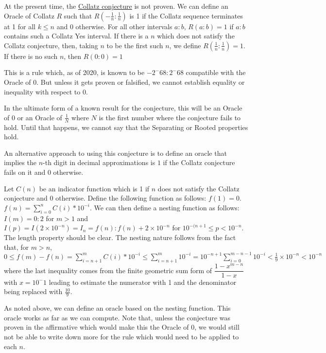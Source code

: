 \documentclass[12pt]{article}
\theoremstyle{remark}
\begin{document}
At the present time, the \href{https://en.wikipedia.org/wiki/Collatz_conjecture}{Collatz conjecture} is not proven. We can define an Oracle of Collatz $R$ such that $R(-\tfrac{1}{n}:\tfrac{1}{n})$ is 1 if the Collatz sequence terminates at 1 for all $k \leq n$ and 0 otherwise. For all other intervals $a:b$, $R(a:b) = 1$ if $a:b$ contains such a Collatz Yes interval. If there is a $n$ which does not satisfy the Collatz conjecture, then, taking $n$ to be the first such $n$, we define $R(\tfrac{1}{n}:\tfrac{1}{n}) = 1$. If there is no such $n$, then $R(0:0) = 1$

This is a rule which, as of 2020, is known to be $-2^-68:2^-68$ compatible with the Oracle of 0. But unless it gets proven or falsified, we cannot establish equality or inequality with respect to 0. 

In the ultimate form of a known result for the conjecture, this will be an Oracle of 0 or an Oracle of $\tfrac{1}{N}$ where $N$ is the first number where the conjecture fails to hold. Until that happens, we cannot say that the Separating or Rooted properties hold. 

An alternative approach to using this conjecture is to define an oracle that implies the $n$-th digit in decimal approximations is $1$ if the Collatz conjecture fails on it and $0$ otherwise.

Let $C(n)$ be an indicator function which is 1 if $n$ does not satisfy the Collatz conjecture and 0 otherwise. Define the following function as follows: $f(1) = 0$. $f(n) = \sum_{i=0}^n C(i)*10^{-i} $.  We can then define a nesting function as follows: $I(m)=0:2$ for $m > 1$ and $I(p) = I(2 \times 10^{-n}) = I_n = f(n): f(n)+2 \times 10^{-n}$ for $10^{-(n+1} \leq p < 10^{-n}$. The length property should be clear. The nesting nature follows from the fact that, for $m > n$,  $0 \leq  f(m)-f(n) = \sum_{i=n+1}^m C(i)*10^{-i} \leq \sum_{i=n+1}^m 10^{-i} = 10^{-n+1}\sum_{i=0}^{m-n-1} 10^{-i} < \tfrac{1}{9} \times 10^{-n} < 10^{-n} $ where the last inequality comes from the finite geometric sum form of $\dfrac{1-x^{m-n}}{1-x}$ with $x=10^-1$ leading to estimate the numerator with 1 and the denominator being replaced with $\tfrac{10}{9}$. 

As noted above, we can define an oracle based on the nesting function. This oracle works as far as we can compute. Note that, unless the conjecture was proven in the affirmative which would make this the Oracle of 0, we would still not be able to write down more for the rule which would need to be applied to each $n$. 
\end{document}
